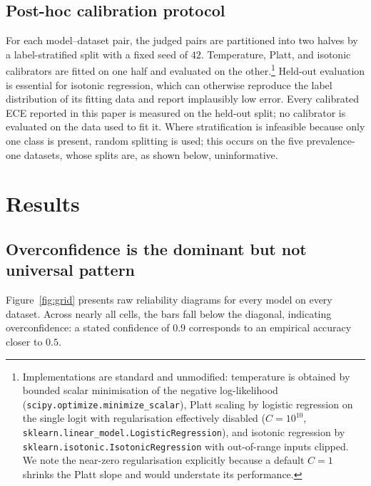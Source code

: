 \documentclass[sn-mathphys-num,pdflatex]{sn-jnl}
\begin{document}
\subsection{Post-hoc calibration protocol}\label{sec:protocol}
For each model--dataset pair, the judged pairs are partitioned into two halves by
a label-stratified split with a fixed seed of $42$. Temperature, Platt, and
isotonic calibrators are fitted on one half and evaluated on the
other.\footnote{Implementations are standard and unmodified: temperature is
obtained by bounded scalar minimisation of the negative log-likelihood
(\texttt{scipy.optimize.minimize\_scalar}), Platt scaling by logistic regression on
the single logit with regularisation effectively disabled ($C = 10^{10}$,
\texttt{sklearn.linear\_model.LogisticRegression}), and isotonic regression by
\texttt{sklearn.isotonic.IsotonicRegression} with out-of-range inputs clipped. We
note the near-zero regularisation explicitly because a default $C=1$ shrinks the
Platt slope and would understate its performance.} Held-out
evaluation is essential for isotonic regression, which can otherwise reproduce the
label distribution of its fitting data and report implausibly low error. Every
calibrated ECE reported in this paper is measured on the held-out split; no
calibrator is evaluated on the data used to fit it. Where stratification is
infeasible because only one class is present, random splitting is used; this
occurs on the five prevalence-one datasets, whose splits are, as shown below,
uninformative.

\section{Results}\label{sec:results}

\subsection{Overconfidence is the dominant but not universal
pattern}\label{sec:overconf}
Figure~\ref{fig:grid} presents raw reliability diagrams for every model on every
dataset. Across nearly all cells, the bars fall below the diagonal, indicating
overconfidence: a stated confidence of $0.9$ corresponds to an empirical accuracy
closer to $0.5$.
\end{document}
